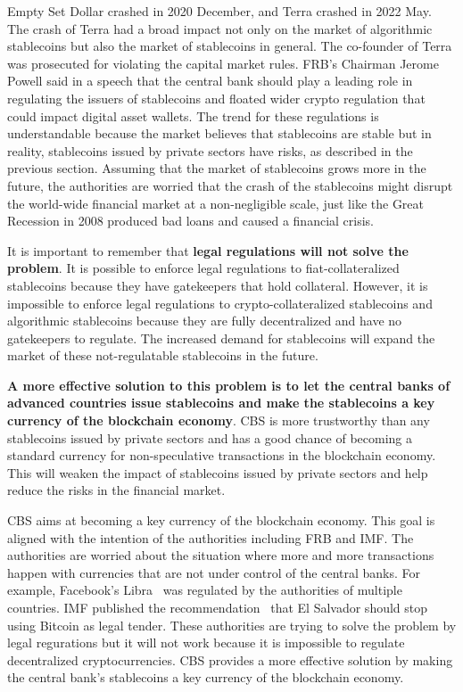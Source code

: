 \documentclass[dvipdfmx,a4paper]{article}
\begin{document}
Empty Set Dollar crashed in 2020 December, and Terra crashed in 2022 May. The crash of Terra had a broad impact not only on the market of algorithmic stablecoins but also the market of stablecoins in general. The co-founder of Terra was prosecuted for violating the capital market rules. FRB's Chairman Jerome Powell said in a speech that the central bank should play a leading role in regulating the issuers of stablecoins and floated wider crypto regulation that could impact digital asset wallets. The trend for these regulations is understandable because the market believes that stablecoins are stable but in reality, stablecoins issued by private sectors have risks, as described in the previous section. Assuming that the market of stablecoins grows more in the future, the authorities are worried that the crash of the stablecoins might disrupt the world-wide financial market at a non-negligible scale, just like the Great Recession in 2008 produced bad loans and caused a financial crisis.

It is important to remember that \textbf{legal regulations will not solve the problem}. It is possible to enforce legal regulations to fiat-collateralized stablecoins because they have gatekeepers that hold collateral. However, it is impossible to enforce legal regulations to crypto-collateralized stablecoins and algorithmic stablecoins because they are fully decentralized and have no gatekeepers to regulate. The increased demand for stablecoins will expand the market of these not-regulatable stablecoins in the future.

\textbf{A more effective solution to this problem is to let the central banks of advanced countries issue stablecoins and make the stablecoins a key currency of the blockchain economy}. CBS is more trustworthy than any stablecoins issued by private sectors and has a good chance of becoming a standard currency for non-speculative transactions in the blockchain economy. This will weaken the impact of stablecoins issued by private sectors and help reduce the risks in the financial market.

CBS aims at becoming a key currency of the blockchain economy. This goal is aligned with the intention of the authorities including FRB and IMF. The authorities are worried about the situation where more and more transactions happen with currencies that are not under control of the central banks. For example, Facebook's Libra~\cite{libra} was regulated by the authorities of multiple countries. IMF published the recommendation~\cite{imfelsalvador} that El Salvador should stop using Bitcoin as legal tender. These authorities are trying to solve the problem by legal regurations but it will not work because it is impossible to regulate decentralized cryptocurrencies. CBS provides a more effective solution by making the central bank's stablecoins a key currency of the blockchain economy.
\end{document}
